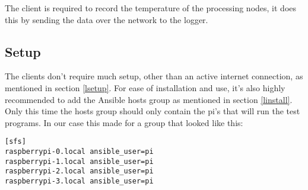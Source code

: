 The client is required to record the temperature of the processing nodes, it does this by sending the data over the network to the logger.
\subsection{Setup}
The clients don't require much setup, other than an active internet connection, as mentioned in section \ref{lsetup}. For ease of installation and use, it's also highly recommended to add the Ansible hosts group as mentioned in section \ref{linstall}. Only this time the hosts group should only contain the pi's that will run the test programs. In our case this made for a group that looked like this:

\begin{lstlisting}[frame=single]
[sfs]
raspberrypi-0.local ansible_user=pi
raspberrypi-1.local ansible_user=pi
raspberrypi-2.local ansible_user=pi
raspberrypi-3.local ansible_user=pi
\end{lstlisting}
